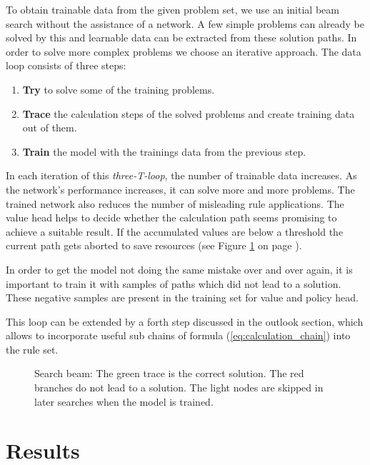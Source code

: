\documentclass{scrartcl}
\theoremstyle{definition}
\begin{document}
To obtain trainable data from the given problem set, we use an initial beam search without the assistance of a network.
A few simple problems can already be solved by this and learnable data can be extracted from these solution paths.
In order to solve more complex problems we choose an iterative approach.
The data loop consists of three steps:


\begin{enumerate}[label=(\roman*)]
	\item \textbf{Try} to solve some of the training problems.
	\item \textbf{Trace} the calculation steps of the solved problems and create training data out of them. 
	\item \textbf{Train} the model with the trainings data from the previous step.
\end{enumerate}
In each iteration of this \textit{three-T-loop}, the number of trainable data increases.
As the network's performance increases, it can solve more and more problems.
The trained network also reduces the number of misleading rule applications.
The value head helps to decide whether the calculation path seems promising to achieve a suitable result.
If the accumulated values are below a threshold the current path gets aborted to save resources (see Figure \ref{fig:beam_search} on page \pageref{fig:beam_search}). 

In order to get the model not doing the same mistake over and over again, it is important to train it with samples of paths which did not lead to a solution. 
These negative samples are present in the training set for value and policy head.


This loop can be extended by a forth step discussed in the outlook section, which allows to incorporate useful sub chains of formula (\ref{eq:calculation_chain}) into the rule set.

\begin{figure}[!htbp]
	\centering
	
	\caption{Search beam: The green trace is the correct solution.
	The red branches do not lead to a solution.
	The light nodes are skipped in later searches when the model is trained.}
	\label{fig:beam_search}
\end{figure}


\section{Results}
\end{document}
